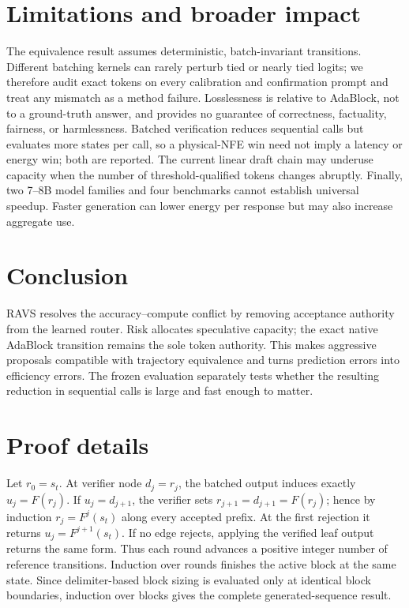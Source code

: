 \documentclass{article}
\newcommand{\method}{\textsc{RAVS}\xspace}
\begin{document}
\section{Limitations and broader impact}

The equivalence result assumes deterministic, batch-invariant transitions. Different batching
kernels can rarely perturb tied or nearly tied logits; we therefore audit exact tokens on every
calibration and confirmation prompt and treat any mismatch as a method failure. Losslessness is
relative to AdaBlock, not to a ground-truth answer, and provides no guarantee of correctness,
factuality, fairness, or harmlessness. Batched verification reduces sequential calls but evaluates
more states per call, so a physical-NFE win need not imply a latency or energy win; both are reported.
The current linear draft chain may underuse capacity when the number of threshold-qualified tokens
changes abruptly. Finally, two 7--8B model families and four benchmarks cannot establish universal
speedup. Faster generation can lower energy per response but may also increase aggregate use.

\section{Conclusion}

\method resolves the accuracy--compute conflict by removing acceptance authority from the learned
router. Risk allocates speculative capacity; the exact native AdaBlock transition remains the sole
token authority. This makes aggressive proposals compatible with trajectory equivalence and turns
prediction errors into efficiency errors. The frozen evaluation separately tests whether the
resulting reduction in sequential calls is large and fast enough to matter.





\appendix

\section{Proof details}
\label{app:proof}

Let $r_0=s_t$. At verifier node $d_j=r_j$, the batched output induces exactly
$u_j=F(r_j)$. If $u_j=d_{j+1}$, the verifier sets $r_{j+1}=d_{j+1}=F(r_j)$; hence by induction
$r_j=F^j(s_t)$ along every accepted prefix. At the first rejection it returns
$u_j=F^{j+1}(s_t)$. If no edge rejects, applying the verified leaf output returns the same form.
Thus each round advances a positive integer number of reference transitions. Induction over rounds
finishes the active block at the same state. Since delimiter-based block sizing is evaluated only
at identical block boundaries, induction over blocks gives the complete generated-sequence result.
\end{document}
